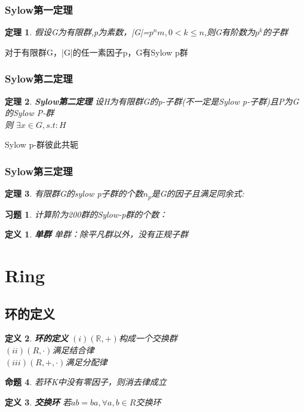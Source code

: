 \documentclass{report}
\newtheorem{theorem}{定理}[section]
\newtheorem{proposition}[theorem]{命题}
\newtheorem{definition}{定义}
\newtheorem{exercise}{习题}[section]
\begin{document}
\subsubsection{Sylow第一定理}
\begin{theorem}
假设G为有限群,p为素数，|G|=$p^{n}m,0<k \leq n$,则G有阶数为$p^{k}$的子群
\end{theorem}
\begin{deduction}
对于有限群G，|G|的任一素因子p，G有Sylow p群
\end{deduction}
\subsubsection{Sylow第二定理}
\begin{theorem}\textbf{Sylow第二定理}
设H为有限群G的p-子群(不一定是Sylow p-子群)且P为G的Sylow P-群
\\则 $\exists x \in G,s.t:H $
\end{theorem}
\begin{deduction}
Sylow p-群彼此共轭
\end{deduction}
\subsubsection{Sylow第三定理}
\begin{theorem}
有限群G的sylow p子群的个数$n_{p}$是G的因子且满足同余式:

\end{theorem}
\begin{exercise}
计算阶为200群的Sylow-p群的个数：
\end{exercise}
\begin{definition} \textbf{单群}
单群：除平凡群以外，没有正规子群
\end{definition}
\section{Ring }

\subsection{环的定义}
\begin{definition} \textbf{环的定义}
\noindent $(i)(\mathbb{R},+)$构成一个交换群 \\
$(ii)(R,\cdot)$满足结合律 \\
$(iii)(R,+,\cdot)$满足分配律\\
\end{definition}
\begin{proposition}
若环K中没有零因子，则消去律成立
\end{proposition}
\begin{definition}\textbf{交换环}
若$ab=ba,\forall a,b \in R$交换环
\end{definition}
\end{document}
